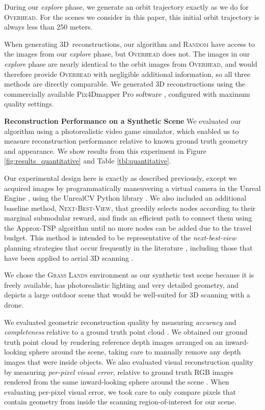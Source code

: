 During our \emph{explore} phase, we generate an orbit trajectory exactly as we do for \textsc{Overhead}.
For the scenes we consider in this paper, this initial orbit trajectory is always less than 250 meters.

When generating 3D\ reconstructions, our algorithm and \textsc{Random} have access to the images from our \emph{explore} phase, but \textsc{Overhead} does not.
The images in our \emph{explore} phase are nearly identical to the orbit images from \textsc{Overhead}, and would therefore provide \textsc{Overhead} with negligible additional information, so all three methods are directly comparable.
We generated 3D reconstructions using the commercially available Pix4Dmapper Pro software \cite{pix4d:2017b}, configured with maximum quality settings.

\vspace{-1pt}
\textbf{Reconstruction Performance on a Synthetic Scene}
We evaluated our algorithm using a photorealistic video game simulator, which
enabled us to measure reconstruction performance relative to known ground truth geometry and appearance.
We show results from this experiment in Figure \ref{fig:results_quantitative} and Table \ref{tbl:quantitative}.

Our experimental design here is exactly as described previously, except we acquired images by programmatically maneuvering a virtual camera in the Unreal Engine \cite{epic:2017a}, using the UnrealCV Python library \cite{qiu:2016}.
We also included an additional baseline method, \textsc{Next-Best-View}, that greedily selects nodes according to their marginal submodular reward, and finds an efficient path to connect them using the Approx-TSP algorithm \cite{cormen:2009} until no more nodes can be added due to the travel budget.
This method is intended to be representative of the \emph{next-best-view} planning strategies that occur frequently in the literature \cite{fan:2016,hollinger:2013,krainin:2011,wu:2014}, including those that have been applied to aerial 3D scanning \cite{dunn:2009a,hoppe:2012,mostegel:2016,schmid:2012}.

We chose the \textsc{Grass Lands} environment \cite{epic:2017b} as our synthetic test scene because it is freely available, has photorealistic lighting and very detailed geometry, and depicts a large outdoor scene that would be well-suited for 3D scanning with a drone.

We evaluated geometric reconstruction quality by measuring \emph{accuracy} and \emph{completeness} relative to a ground truth point cloud \cite{aanaes:2016,knapitsch:2017}.
We obtained our ground truth point cloud by rendering reference depth images arranged on an inward-looking sphere around the scene, taking care to manually remove any depth images that were inside objects.
We also evaluated visual reconstruction quality by measuring \emph{per-pixel visual error}, relative to ground truth RGB images rendered from the same inward-looking sphere around the scene \cite{waechter:2017}.
When evaluating per-pixel visual error, we took care to only compare pixels that contain geometry from inside the scanning region-of-interest for our scene.

